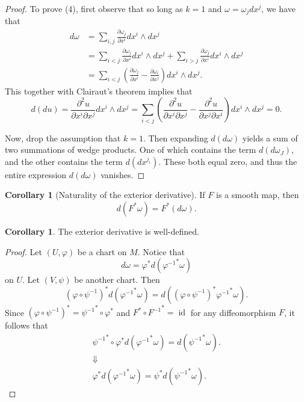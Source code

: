 \documentclass[10pt,letterpaper,cm]{nupset}
\theoremstyle{definition}
\theoremstyle{theorem}
\newtheorem{corollary}[definition]{Corollary}
\theoremstyle{remark}
\newcommand{\1}{\mathbf{1}}
\newcommand{\0}{\vec 0}
\DeclareMathOperator{\id}{id}
\begin{document}
\begin{proof}
To prove (4), first observe that so long as $k=1$ and  $\omega = \omega_jdx^j$, we have that
\begin{align*}
d \omega & =   \sum_{i, j}\frac{\partial{\omega_j}}{\partial{x^i}}dx^i \wedge dx^j 
\\ & = \sum_{i< j}\frac{\partial{\omega_j}}{\partial{x^i}}dx^i \wedge dx^j + \sum_{i>j}\frac{\partial{\omega_j}}{\partial{x^i}}dx^i \wedge dx^j 
\\ & =\sum_{i<j}\left(\frac{\partial{\omega_j}}{\partial{x^i}} - \frac{\partial{\omega_i}}{\partial{x^j}}\right)dx^i \wedge dx^j.
\end{align*} This together with Clairaut's theorem implies that  $$d(du) =\frac{\partial^2{u}}{\partial{x^i}\partial{x^j}}dx^i \wedge dx^j = \sum_{i<j}\left( \frac{\partial^2{u}}{\partial{x^i}\partial{x^j}} - \frac{\partial^2{u}}{\partial{x^j}\partial{x^i}}\right)dx^i \wedge dx^j = 0.  $$ 

Now, drop the assumption that $k=1$. Then expanding $d(d\omega)$ yields a sum of two summations of wedge products. One of which contains the term $d(d\omega_J)$, and the other contains the term $d(dx^{j_i})$. These both equal zero, and thus the entire expression $d(d\omega)$ vanishes.
\end{proof}

\begin{corollary}[Naturality of the exterior derivative]\label{natural}
If $F$ is a smooth map, then $$d(F^{\ast} \omega) = F^{\ast}(d \omega).$$
\end{corollary}

\begin{corollary}
The exterior derivative is well-defined.
\end{corollary}
\begin{proof}
Let $(U, \varphi)$ be a chart on $M$. Notice that $$d\omega = \varphi^{\ast} d\left({\varphi^{-1}}^{\ast}\omega\right)$$ on $U$. Let $(V, \psi)$ be another chart. Then $$ \left(\varphi \circ \psi^{-1}\right)^{\ast} d\left({\varphi^{-1}}^{\ast} \omega\right) =  d\left( \left(\varphi \circ \psi^{-1}\right)^{\ast}{\varphi^{-1}}^{\ast} \omega\right).$$ Since $\left(\varphi \circ \psi^{-1}\right)^{\ast} = {\psi^{-1}}^{\ast} \circ \varphi^{\ast}$ and $F^{\ast} \circ {F^{-1}}^{\ast}= \id$ for any diffeomorphism $F$, 
it follows that 
\begin{gather*}
{\psi^{-1}}^{\ast} \circ \varphi^{\ast}d\left({\varphi^{-1}}^{\ast} \omega\right) = d\left({\psi^{-1}}^{\ast} \omega\right).
\\ \Downarrow
 \\ \varphi^{\ast}d\left({\varphi^{-1}}^{\ast} \omega\right)  = \psi^{\ast} d\left({\psi^{-1}}^{\ast} \omega\right).
 \end{gather*}
\end{proof}
\end{document}
